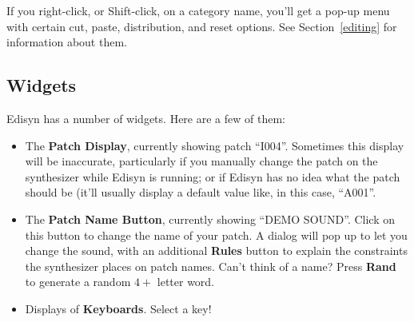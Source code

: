 \documentclass{article}
\begin{document}
If you right-click, or Shift-click, on a category name, you'll get a pop-up menu with certain cut, paste, distribution, and reset options.  See Section~\ref{editing} for information about them.

\subsection{Widgets}  Edisyn has a number of widgets.  Here are a few of them:

\begin{itemize} 

\item The {\bf Patch Display}, currently showing patch ``I004''.  Sometimes this display will be inaccurate, particularly if you manually change the patch on the synthesizer while Edisyn is running; or if Edisyn has no idea what the patch should be (it'll usually display a default value like, in this case, ``A001''.

\item The {\bf Patch Name Button}, currently showing ``DEMO SOUND''.  Click on this button to change the name of your patch.  A dialog will pop up to let you change the sound, with an additional {\bf Rules} button to explain the constraints the synthesizer places on patch names. Can't think of a name?  Press {\bf Rand} to generate a random \(4+\) letter word.

\item Displays of {\bf Keyboards}.  Select a key!
\end{itemize}
\end{document}
